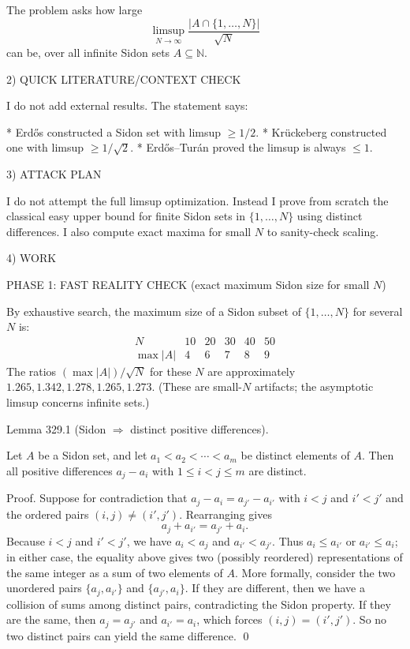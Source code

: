 The problem asks how large
\[
\limsup_{N\to\infty}\frac{|A\cap\{1,\dots,N\}|}{\sqrt{N}}
\]
can be, over all infinite Sidon sets $A\subseteq\mathbb N$.


2) QUICK LITERATURE/CONTEXT CHECK

I do not add external results.
The statement says:

* Erd\H{o}s constructed a Sidon set with limsup $\ge 1/2$.
* Kr\"{u}ckeberg constructed one with limsup $\ge 1/\sqrt{2}$.
* Erd\H{o}s--Tur\'an proved the limsup is always $\le 1$.


3) ATTACK PLAN

I do not attempt the full limsup optimization.
Instead I prove from scratch the classical easy upper bound for finite Sidon sets in $\{1,\dots,N\}$ using distinct differences.
I also compute exact maxima for small $N$ to sanity-check scaling.


4) WORK

PHASE 1: FAST REALITY CHECK (exact maximum Sidon size for small $N$)

By exhaustive search, the maximum size of a Sidon subset of $\{1,\dots,N\}$ for several $N$ is:
\[
\begin{array}{c|ccccc}
N & 10 & 20 & 30 & 40 & 50\\\hline
\max |A| & 4 & 6 & 7 & 8 & 9
\end{array}
\]
The ratios $(\max|A|)/\sqrt{N}$ for these $N$ are approximately $1.265,1.342,1.278,1.265,1.273$.
(These are small-$N$ artifacts; the asymptotic limsup concerns infinite sets.)


Lemma 329.1 (Sidon $\Rightarrow$ distinct positive differences).

Let $A$ be a Sidon set, and let $a_1<a_2<\cdots<a_m$ be distinct elements of $A$.
Then all positive differences $a_j-a_i$ with $1\le i<j\le m$ are distinct.

Proof.
Suppose for contradiction that $a_j-a_i=a_{j'}-a_{i'}$ with $i<j$ and $i'<j'$ and the ordered pairs $(i,j)\neq(i',j')$.
Rearranging gives
\[
a_j+a_{i'}=a_{j'}+a_i.
\]
Because $i<j$ and $i'<j'$, we have $a_i<a_j$ and $a_{i'}<a_{j'}$.
Thus $a_i\le a_{i'}$ or $a_{i'}\le a_i$; in either case, the equality above gives two (possibly reordered) representations of the same integer as a sum of two elements of $A$.
More formally, consider the two unordered pairs $\{a_j,a_{i'}\}$ and $\{a_{j'},a_i\}$.
If they are different, then we have a collision of sums among distinct pairs, contradicting the Sidon property.
If they are the same, then $a_j=a_{j'}$ and $a_{i'}=a_i$, which forces $(i,j)=(i',j')$.
So no two distinct pairs can yield the same difference.
\qed



